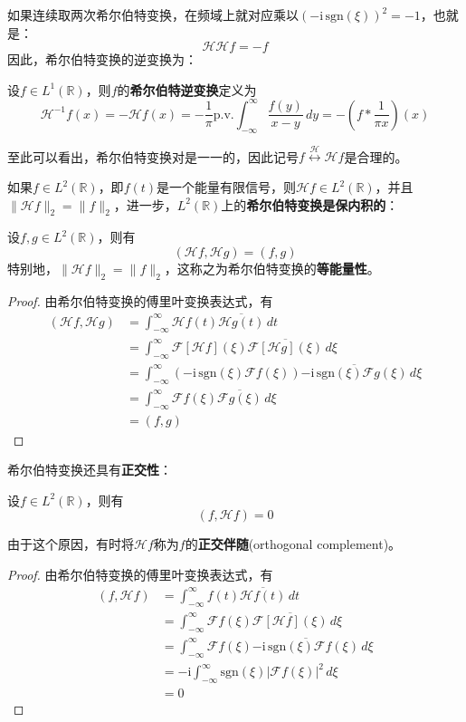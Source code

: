 如果连续取两次希尔伯特变换，在频域上就对应乘以$(-\mathrm{i}\,\text{sgn}(\xi))^2=-1$，也就是：
\[\mathcal{H} \mathcal{H} f=-f\]
因此，希尔伯特变换的逆变换为：
\begin{definition}[希尔伯特逆变换]
    设$f\in L^1(\mathbb{R})$，则$f$的\textbf{希尔伯特逆变换}定义为
    \[\mathcal{H} ^{-1} f(x)=-\mathcal{H} f(x)=-\frac{1}{\pi}\text{p.v.}\int_{-\infty}^{\infty}\frac{f(y)}{x-y}\,dy=-\left(f*\frac{1}{\pi x}\right)(x)\]
\end{definition}
至此可以看出，希尔伯特变换对是一一的，因此记号$f\overset{\mathcal{H} }{\longleftrightarrow} \mathcal{H} f$是合理的。

如果$f\in L^2(\mathbb{R})$，即$f(t)$是一个能量有限信号，则$\mathcal{H} f\in L^2(\mathbb{R})$，并且$\|\mathcal{H} f\|_2=\|f\|_2$，进一步，$L^2(\mathbb{R})$上的\textbf{希尔伯特变换是保内积的}：
\begin{theorem}
    设$f,g\in L^2(\mathbb{R})$，则有
    \[(\mathcal{H} f,\mathcal{H} g)=(f,g)\]
    特别地，$\|\mathcal{H} f\|_2=\|f\|_2$，这称之为希尔伯特变换的\textbf{等能量性}。
\end{theorem}
\begin{proof}
    由希尔伯特变换的傅里叶变换表达式，有
    \begin{align*}
        (\mathcal{H} f,\mathcal{H} g)&=\int_{-\infty}^{\infty}\mathcal{H} f(t)\overline{\mathcal{H} g(t)}\,dt\\
        &=\int_{-\infty}^{\infty}\mathcal{F} [\mathcal{H} f](\xi)\overline{\mathcal{F} [\mathcal{H} g](\xi)}\,d\xi\\
        &=\int_{-\infty}^{\infty}(-\mathrm{i}\,\text{sgn}(\xi)\mathcal{F} f(\xi))\overline{-\mathrm{i}\,\text{sgn}(\xi)\mathcal{F} g(\xi)}\,d\xi\\
        &=\int_{-\infty}^{\infty}\mathcal{F} f(\xi)\overline{\mathcal{F} g(\xi)}\,d\xi\\
        &=(f,g)
    \end{align*}
\end{proof}

希尔伯特变换还具有\textbf{正交性}：
\begin{theorem}
    设$f\in L^2(\mathbb{R})$，则有
    \[(f,\mathcal{H} f)=0\]
\end{theorem}
由于这个原因，有时将$\mathcal{H} f$称为$f$的\textbf{正交伴随}(orthogonal complement)。
\begin{proof}
    由希尔伯特变换的傅里叶变换表达式，有
    \begin{align*}
        (f,\mathcal{H} f)&=\int_{-\infty}^{\infty}f(t)\overline{\mathcal{H} f(t)}\,dt\\
        &=\int_{-\infty}^{\infty}\mathcal{F} f(\xi)\overline{\mathcal{F} [\mathcal{H} f](\xi)}\,d\xi\\
        &=\int_{-\infty}^{\infty}\mathcal{F} f(\xi)\overline{-\mathrm{i}\,\text{sgn}(\xi)\mathcal{F} f(\xi)}\,d\xi\\
        &=-\mathrm{i}\int_{-\infty}^{\infty}\text{sgn}(\xi)|\mathcal{F} f(\xi)|^2\,d\xi\\
        &=0
    \end{align*}
\end{proof}


